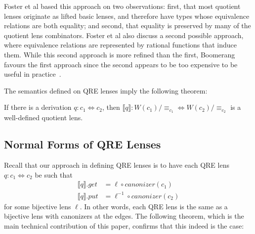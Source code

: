 \documentclass[acmsmall,review,anonymous]{acmart}
\newcommand{\kw}[1]{\ensuremath{\mathit{#1}}}
\newcommand{\canonizer}{\ensuremath{\kw{canonizer}}}
\newcommand{\get}{\ensuremath{\kw{get}}}
\newcommand{\lput}{\ensuremath{\kw{put}}}
\newcommand{\eqrel}[1]{\ensuremath{\equiv_{#1}}}
\begin{document}
Foster et al based this approach on two observations: first, that most quotient
lenses originate as lifted basic lenses, and therefore have types whose
equivalence relations are both equality; and second, that equality is preserved
by many of the quotient lens combinators. Foster et al also discuss a second
possible approach, where equivalence relations are represented by rational
functions that induce them. While this second approach is more refined than the
first, Boomerang favours the first approach since the second appears to be too
expensive to be useful in practice~\cite{quotientlenses}.

The semantics defined on QRE lenses imply the following theorem:
\begin{theorem}
If there is a derivation $q : c_1 \Leftrightarrow c_2$, then $\llbracket q
\rrbracket : W(c_1)/{\eqrel{c_1}} \Leftrightarrow W(c_2)/{\eqrel{c_2}}$ is a
well-defined quotient lens.
\end{theorem}
\subsection{Normal Forms of QRE Lenses}
Recall that our approach in defining QRE lenses is to have each QRE lens $q: c_1
\Leftrightarrow c_2$ be such that
\begin{align*}
\llbracket q \rrbracket.\get &= \ell \circ \canonizer(c_1)\\
\llbracket q \rrbracket.\lput &= \ell^{-1} \circ \canonizer(c_2)
\end{align*}
for some bijective lens $\ell$. In other words, each QRE lens is the same as a
bijective lens with canonizers at the edges. The following theorem,
which is the main technical contribution of this paper, confirms that this
indeed is the case:
\end{document}

